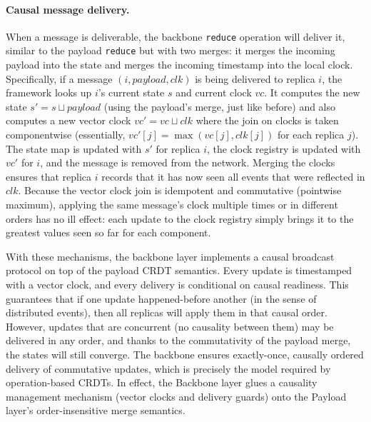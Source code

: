 \paragraph{Causal message delivery.}
When a message is deliverable, the backbone \texttt{reduce} operation will deliver it, similar to the payload \texttt{reduce} but with two merges: it merges the incoming payload into the state and merges the incoming timestamp into the local clock. Specifically, if a message $(i, \mathit{payload}, clk)$ is being delivered to replica $i$, the framework looks up $i$’s current state $s$ and current clock $vc$. It computes the new state $s' = s \sqcup \mathit{payload}$ (using the payload’s merge, just like before) and also computes a new vector clock $vc' = vc \sqcup clk$ where the join on clocks is taken componentwise (essentially, $vc'[j] = \max(vc[j], clk[j])$ for each replica $j$). The state map is updated with $s'$ for replica $i$, the clock registry is updated with $vc'$ for $i$, and the message is removed from the network. Merging the clocks ensures that replica $i$ records that it has now seen all events that were reflected in $clk$. Because the vector clock join is idempotent and commutative (pointwise maximum), applying the same message’s clock multiple times or in different orders has no ill effect: each update to the clock registry simply brings it to the greatest values seen so far for each component.

With these mechanisms, the backbone layer implements a causal broadcast protocol on top of the payload CRDT semantics. Every update is timestamped with a vector clock, and every delivery is conditional on causal readiness. This guarantees that if one update happened-before another (in the sense of distributed events), then all replicas will apply them in that causal order. However, updates that are concurrent (no causality between them) may be delivered in any order, and thanks to the commutativity of the payload merge, the states will still converge. The backbone ensures exactly-once, causally ordered delivery of commutative updates, which is precisely the model required by operation-based CRDTs. In effect, the Backbone layer glues a causality management mechanism (vector clocks and delivery guards) onto the Payload layer’s order-insensitive merge semantics.

